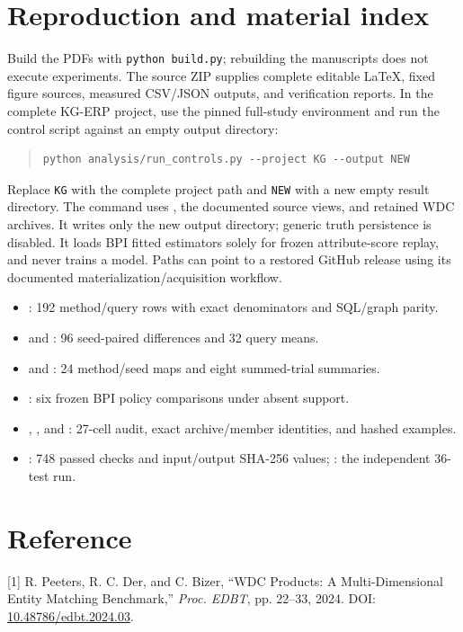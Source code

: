 \documentclass[11pt,letterpaper]{article}
\begin{document}
\section{Reproduction and material index}
Build the PDFs with \texttt{python build.py}; rebuilding the manuscripts does not execute experiments. The source ZIP supplies complete editable LaTeX, fixed figure sources, measured CSV/JSON outputs, and verification reports. In the complete KG-ERP project, use the pinned full-study environment and run the control script against an empty output directory:

\begin{quote}\small
\begin{verbatim}
python analysis/run_controls.py --project KG --output NEW
\end{verbatim}
\end{quote}

\noindent Replace \texttt{KG} with the complete project path and \texttt{NEW} with a new empty result directory. The command uses , the documented source views, and retained WDC archives. It writes only the new output directory; generic truth persistence is disabled. It loads BPI fitted estimators solely for frozen attribute-score replay, and never trains a model. Paths can point to a restored GitHub release using its documented materialization/acquisition workflow.

\begin{itemize}
\item {}: 192 method/query rows with exact denominators and SQL/graph parity.
\item {} and : 96 seed-paired differences and 32 query means.
\item {} and : 24 method/seed maps and eight summed-trial summaries.
\item {}: six frozen BPI policy comparisons under absent support.
\item {}, , and : 27-cell audit, exact archive/member identities, and hashed examples.
\item {}: 748 passed checks and input/output SHA-256 values; : the independent 36-test run.
\end{itemize}

\section*{Reference}
[1] R. Peeters, R. C. Der, and C. Bizer, ``WDC Products: A Multi-Dimensional Entity Matching Benchmark,'' \emph{Proc. EDBT}, pp. 22--33, 2024. DOI: \href{https://doi.org/10.48786/edbt.2024.03}{10.48786/edbt.2024.03}.
\end{document}
